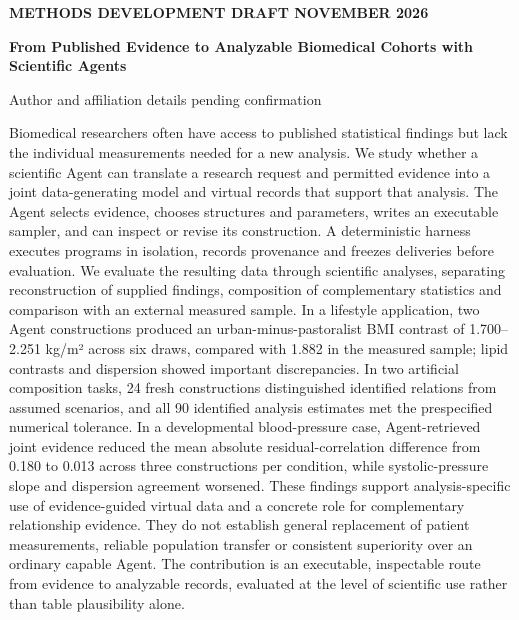 \documentclass[11pt,letterpaper]{article}
\renewenvironment{abstract}{\small\par\noindent{\sffamily\bfseries\color{ink}Abstract}\quad\ignorespaces}{\par\medskip}
\begin{document}
\thispagestyle{plain}
{\sffamily\footnotesize\color{accent}\bfseries METHODS DEVELOPMENT DRAFT\quad\textbar{} NOVEMBER 2026\par}
\vspace{.7em}
{\raggedright\sffamily\bfseries\fontsize{24}{29}\selectfont\color{ink}From Published Evidence to Analyzable Biomedical Cohorts with Scientific Agents\par}
\vspace{.5em}
{\small Author and affiliation details pending confirmation\par}
\vspace{.7em}
\begin{abstract}

Biomedical researchers often have access to published statistical findings but lack the individual measurements needed for a new analysis. We study whether a scientific Agent can translate a research request and permitted evidence into a joint data-generating model and virtual records that support that analysis. The Agent selects evidence, chooses structures and parameters, writes an executable sampler, and can inspect or revise its construction. A deterministic harness executes programs in isolation, records provenance and freezes deliveries before evaluation. We evaluate the resulting data through scientific analyses, separating reconstruction of supplied findings, composition of complementary statistics and comparison with an external measured sample. In a lifestyle application, two Agent constructions produced an urban-minus-pastoralist BMI contrast of 1.700–\allowbreak{}2.251 kg/\allowbreak{}m² across six draws, compared with 1.882 in the measured sample; lipid contrasts and dispersion showed important discrepancies. In two artificial composition tasks, 24 fresh constructions distinguished identified relations from assumed scenarios, and all 90 identified analysis estimates met the prespecified numerical tolerance. In a developmental blood-pressure case, Agent-retrieved joint evidence reduced the mean absolute residual-correlation difference from 0.180 to 0.013 across three constructions per condition, while systolic-pressure slope and dispersion agreement worsened. These findings support analysis-specific use of evidence-guided virtual data and a concrete role for complementary relationship evidence. They do not establish general replacement of patient measurements, reliable population transfer or consistent superiority over an ordinary capable Agent. The contribution is an executable, inspectable route from evidence to analyzable records, evaluated at the level of scientific use rather than table plausibility alone.

\end{abstract}
\end{document}
